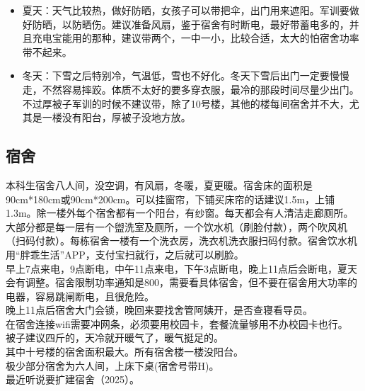 \documentclass[12pt]{article} %
\begin{document}
	\begin{itemize}
	\item 夏天：天气比较热，做好防晒，女孩子可以带把伞，出门用来遮阳。军训要做好防晒，以防晒伤。建议准备风扇，鉴于宿舍有时断电，最好带蓄电多的，并且充电宝能用的那种，建议带两个，一中一小，比较合适，太大的怕宿舍功率带不起来。\\
	
	\item 冬天：下雪之后特别冷，气温低，雪也不好化。冬天下雪后出门一定要慢慢走，不然容易摔跤。体质不太好的要多穿衣服，最冷的那段时间尽量少出门。不过厚被子军训的时候不建议带，除了10号楼，其他的楼每间宿舍并不大，尤其是一楼没有阳台，厚被子没地方放。\\
	


	\end{itemize}
	\subsection{宿舍} %
	
本科生宿舍八人间，没空调，有风扇，冬暖，夏更暖。宿舍床的面积是90cm*180cm或90cm*200cm。可以挂窗帘，下铺买床帘的话建议1.5m，上铺1.3m。除一楼外每个宿舍都有一个阳台，有纱窗。每天都会有人清洁走廊厕所。\\

大部分都是每一层有一个盥洗室及厕所，一个饮水机（刷脸付款），两个吹风机（扫码付款）。每栋宿舍一楼有一个洗衣房，洗衣机洗衣服扫码付款。宿舍饮水机用“胖乖生活”APP，支付宝扫就行，之后就可以刷脸。\\

早上7点来电，9点断电，中午11点来电，下午3点断电，晚上11点后会断电，夏天会有调整。宿舍限制功率通知是800，需要看具体宿舍，但不要在宿舍用大功率的电器，容易跳闸断电，且很危险。\\

晚上11点后宿舍大门会锁，晚回来要找舍管阿姨开，是否查寝看导员。\\

在宿舍连接wifi需要冲网条，必须要用校园卡，套餐流量够用不办校园卡也行。\\

被子建议四斤的，天冷就开暖气了，暖气挺足的。\\

其中十号楼的宿舍面积最大。所有宿舍楼一楼没阳台。\\

极少部分宿舍为六人间，上床下桌(宿舍号带H)。\\

最近听说要扩建宿舍（2025）。
\end{document}
